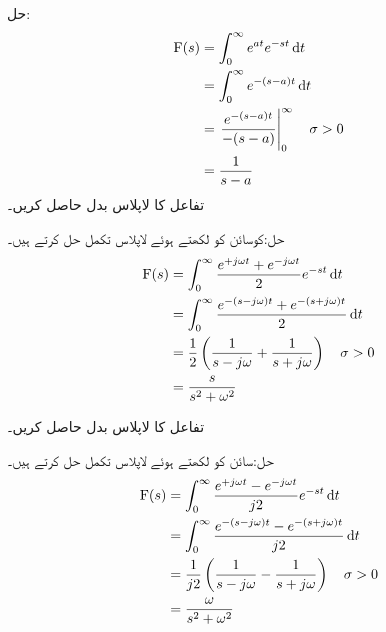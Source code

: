 حل:
\begin{align*}
\bF(s)&=\int_0^{\infty} e^{at} e^{-st} \dif t\\
&=\int_0^{\infty} e^{-(s-a)t} \dif t\\
&=\left. \frac{e^{-(s-a)t}}{-(s-a)}\right|_0^{\infty} \quad \sigma>0\\
&=\frac{1}{s-a}
\end{align*}
تفاعل  کا لاپلاس بدل حاصل کریں۔

حل:کوسائن کو  لکھتے ہوئے لاپلاس تکمل حل کرتے ہیں۔
\begin{align*}
\bF(s)&=\int_0^{\infty} \frac{e^{+j\omega t}+e^{-j\omega t}}{2} e^{-st} \dif t\\
&=\int_0^{\infty} \frac{e^{-(s-j\omega)t}+e^{-(s+j\omega)t}}{2} \dif t\\
&=\frac{1}{2}\left(\frac{1}{s-j\omega}+\frac{1}{s+j\omega}\right) \quad \sigma>0\\
&=\frac{s}{s^2+\omega^2}
\end{align*}

تفاعل  کا لاپلاس بدل حاصل کریں۔

حل:سائن کو  لکھتے ہوئے لاپلاس تکمل حل کرتے ہیں۔
\begin{align*}
\bF(s)&=\int_0^{\infty} \frac{e^{+j\omega t}-e^{-j\omega t}}{j2} e^{-st} \dif t\\
&=\int_0^{\infty} \frac{e^{-(s-j\omega)t}-e^{-(s+j\omega)t}}{j2} \dif t\\
&=\frac{1}{j2}\left(\frac{1}{s-j\omega}-\frac{1}{s+j\omega}\right) \quad \sigma>0\\
&=\frac{\omega}{s^2+\omega^2}
\end{align*}

